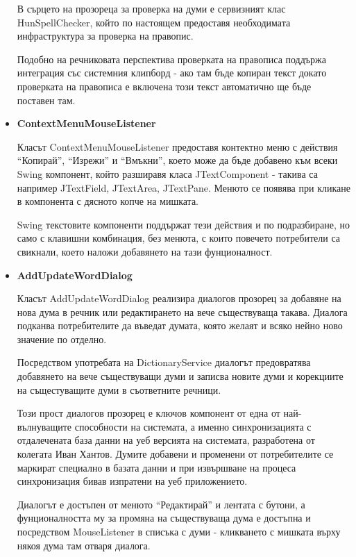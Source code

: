 \begin{itemize}
     В сърцето на прозореца за проверка на думи е сервизният клас
     HunSpellChecker, който по настоящем предоставя необходимата
     инфраструктура за проверка на правопис.

     Подобно на речниковата перспектива проверката на правописа
     поддържа интеграция със системния клипборд - ако там бъде копиран
     текст докато проверката на правописа е включена този текст
     автоматично ще бъде поставен там.
   \item \textbf{ContextMenuMouseListener}

     Класът ContextMenuMouseListener предоставя контектно меню с
     действия "`Копирай"', "`Изрежи"' и "`Вмъкни"', което може да бъде
     добавено към всеки Swing компонент, който разширавя класа
     JTextComponent - такива са например JTextField, JTextArea,
     JTextPane. Менюто се появява при кликане в компонента с дясното
     копче на мишката. 

     Swing текстовите компоненти поддържат тези действия и по
     подразбиране, но само с клавишни комбинация, без менюта, с които
     повечето потребители са свикнали, което наложи добавянето на тази
     фунционалност. 
   \item \textbf{AddUpdateWordDialog}

     Класът AddUpdateWordDialog реализира диалогов прозорец за
     добавяне на нова дума в речник или редактирането на вече
     съществуваща такава. Диалога подканва потребителите да въведат
     думата, която желаят и всяко нейно ново значение по отделно. 

     Посредством употребата на DictionaryService диалогът предовратява
     добавянето на вече съществуващи думи и записва новите думи и
     корекциите на същестуващите думи в съответните речници.

     Този прост диалогов прозорец е ключов компонент от една от
     най-вълнуващите способности на системата, а именно
     синхронизацията с отдалечената база данни на уеб версията на
     системата, разработена от колегата Иван Хантов. Думите добавени и
     променени от потребителите се маркират специално в базата данни и
     при извършване на процеса синхронизация бивав изпратени на уеб
     приложението. 

     Диалогът е достъпен от менюто "`Редактирай"' и лентата с бутони,
     а фунционалността му за промяна на съществуваща дума е достъпна и
     посредством MouseListener в списъка с думи - кликването с мишката
     върху някоя дума там отваря диалога.
\end{itemize}


